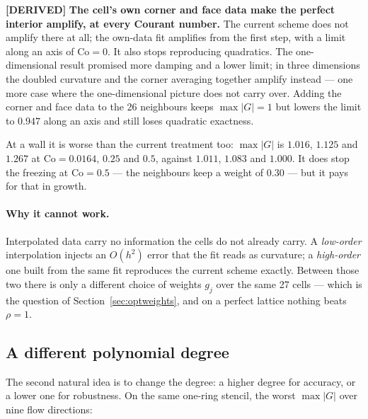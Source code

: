 \documentclass[11pt,a4paper]{article}
\newcommand{\derived}{\textcolor{blue!50!black}{\textbf{[DERIVED]}}}
\begin{document}
\derived{} \textbf{The cell's own corner and face data make the perfect interior amplify, at every
Courant number.} The current scheme does not amplify there at all; the own-data fit amplifies
from the first step, with a limit along an axis of \(\mathrm{Co} = 0\). It also stops reproducing
quadratics. The one-dimensional result promised more damping and a lower limit; in three
dimensions the doubled curvature and the corner averaging together amplify instead --- one more
case where the one-dimensional picture does not carry over. Adding the corner and face data to
the 26 neighbours keeps \(\max|G| = 1\) but lowers the limit to \(0.947\) along an axis and still
loses quadratic exactness.

At a wall it is worse than the current treatment too: \(\max|G|\) is \(1.016\), \(1.125\) and
\(1.267\) at \(\mathrm{Co} = 0.0164\), \(0.25\) and \(0.5\), against \(1.011\), \(1.083\) and \(1.000\).
It does stop the freezing at \(\mathrm{Co} = 0.5\) --- the neighbours keep a weight of \(0.30\) ---
but it pays for that in growth.

\paragraph{Why it cannot work.} Interpolated data carry no information the cells do not already
carry. A \emph{low-order} interpolation injects an \(O(h^2)\) error that the fit reads as
curvature; a \emph{high-order} one built from the same fit reproduces the current scheme exactly.
Between those two there is only a different choice of weights \(g_j\) over the same 27 cells ---
which is the question of Section~\ref{sec:optweights}, and on a perfect lattice nothing beats
\(\rho = 1\).

\subsection{A different polynomial degree}
\label{sec:degree}

The second natural idea is to change the degree: a higher degree for accuracy, or a lower one
for robustness. On the same one-ring stencil, the worst \(\max|G|\) over nine flow directions:
\end{document}
